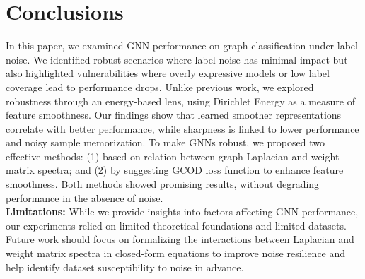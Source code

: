 \documentclass{article}
\theoremstyle{definition}
\newcommand{\method}{GCOD }
\begin{document}
\section{Conclusions}
\label{sec: conclusions}
In this paper, we examined GNN performance on graph classification under label noise. We identified robust scenarios where label noise has minimal impact but also highlighted vulnerabilities where overly expressive models or low label coverage lead to performance drops. Unlike previous work, we explored robustness through an energy-based lens, using Dirichlet Energy as a measure of feature smoothness. Our findings show that learned smoother representations correlate with better performance, while sharpness is linked to lower performance and noisy sample memorization. To make GNNs robust, we proposed two effective methods: (1) based on relation between graph Laplacian and weight matrix spectra; and (2) by suggesting \method loss function to enhance feature smoothness. Both methods showed promising results, without degrading performance in the absence of noise.\\
\textbf{Limitations:} While we provide insights into factors affecting GNN performance, our experiments relied on limited theoretical foundations and limited datasets. Future work should focus on formalizing the interactions between Laplacian and weight matrix spectra in closed-form equations to improve noise resilience and help identify dataset susceptibility to noise in advance.
\end{document}
